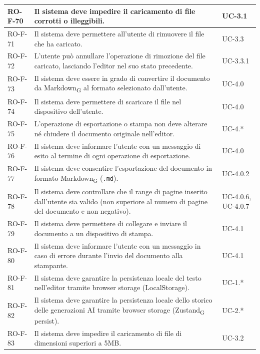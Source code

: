 \documentclass[11pt,a4paper]{article}
\newcommand{\gls}[1]{#1\textsubscript{G}}
\begin{document}
\begin{longtable}{|p{}|>{\raggedright\arraybackslash}p{}|p{}|}
\hline
RO-F-70 & Il sistema deve impedire il caricamento di file corrotti o illeggibili. & UC-3.1 \\
\hline
RO-F-71 & Il sistema deve permettere all'utente di rimuovere il file che ha caricato. & UC-3.3 \\
\hline
RO-F-72 & L'utente può annullare l'operazione di rimozione del file caricato, lasciando l'editor nel suo stato precedente. & UC-3.3.1 \\
\hline
RO-F-73 & Il sistema deve essere in grado di convertire il documento da \gls{Markdown} al formato selezionato dall'utente. & UC-4.0 \\
\hline
RO-F-74 & Il sistema deve permettere di scaricare il file nel dispositivo dell'utente. & UC-4.0 \\
\hline
RO-F-75 & L'operazione di esportazione o stampa non deve alterare né chiudere il documento originale nell'editor. & UC-4.* \\
\hline
RO-F-76 & Il sistema deve informare l'utente con un messaggio di esito al termine di ogni operazione di esportazione. & UC-4.0 \\
\hline
RO-F-77 & Il sistema deve consentire l'esportazione del documento in formato \gls{Markdown} (\texttt{.md}). & UC-4.0.2 \\
\hline
RO-F-78 & Il sistema deve controllare che il range di pagine inserito dall'utente sia valido (non superiore al numero di pagine del documento e non negativo). & UC-4.0.6, UC-4.0.7 \\
\hline
RO-F-79 & Il sistema deve permettere di collegare e inviare il documento a un dispositivo di stampa. & UC-4.1 \\
\hline
RO-F-80 & Il sistema deve informare l'utente con un messaggio in caso di errore durante l'invio del documento alla stampante. & UC-4.1 \\
\hline
RO-F-81 & Il sistema deve garantire la persistenza locale del testo nell'editor tramite browser storage (LocalStorage). & UC-1.* \\
\hline
RO-F-82 & Il sistema deve garantire la persistenza locale dello storico delle generazioni AI tramite browser storage (\gls{Zustand} persist). & UC-2.* \\
\hline
RO-F-83 & Il sistema deve impedire il caricamento di file di dimensioni superiori a 5MB. & UC-3.2 \\
\hline


\end{longtable}
\end{document}
